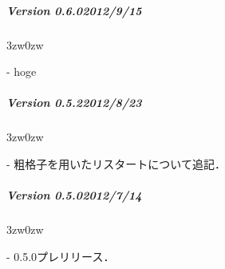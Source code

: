 { \small

%
\subparagraph{Version 0.6.0\hspace{1cm}2012/9/15}

\begin{description}
\begin{indentation}{3zw}{0zw}
\item[-] hoge
\end{indentation}
\end{description}
\vspace{3mm}

%
\subparagraph{Version 0.5.2\hspace{1cm}2012/8/23}

\begin{description}
\begin{indentation}{3zw}{0zw}
\item[-] 粗格子を用いたリスタートについて追記．
\end{indentation}
\end{description}
\vspace{3mm}

%
\subparagraph{Version 0.5.0\hspace{1cm}2012/7/14}

\begin{description}
\begin{indentation}{3zw}{0zw}
\item[-] 0.5.0プレリリース．
\end{indentation}
\end{description}

} %
